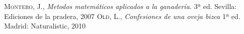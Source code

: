 \renewcommand{\refname}{Bibliografía}
\begin{thebibliography}{a}
 \textsc{Montero, J.},
\textit{Metodos matemáticos aplicados a la ganadería.}
3ª ed. Sevilla: Ediciones de la pradera, 2007  
 \textsc{Old, L.},
\textit{Confesiones de una oveja bizca}
1ª ed. Madrid: Naturalistic, 2010 
\end{thebibliography}

